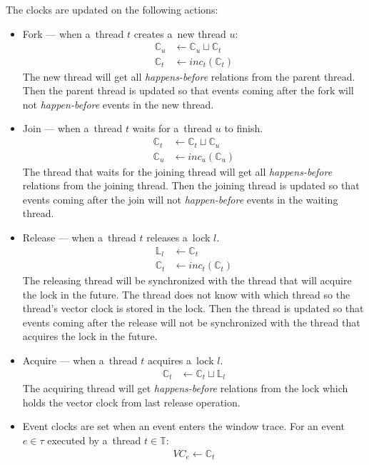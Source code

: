 The clocks are updated on the following actions:
\begin{itemize}
    \item Fork --- when a~thread $t$ creates a~new thread $u$:
        \begin{align*}
            \mathbb{C}_u &\leftarrow \mathbb{C}_u \sqcup \mathbb{C}_t \\
            \mathbb{C}_t &\leftarrow inc_t(\mathbb{C}_t)
        \end{align*}
        The new thread will get all \emph{happens-before} relations from the
        parent thread. Then the parent thread is updated so that events coming
        after the fork will not \emph{happen-before} events in the new thread.
    \item Join --- when a~thread $t$ waits for a~thread $u$ to finish.
        \begin{align*}
            \mathbb{C}_t &\leftarrow \mathbb{C}_t \sqcup \mathbb{C}_u \\
            \mathbb{C}_u &\leftarrow inc_u(\mathbb{C}_u)
        \end{align*}
        The thread that waits for the joining thread will get all
        \emph{happens-before} relations from the joining thread. Then the
        joining thread is updated so that events coming after the join will not
        \emph{happen-before} events in the waiting thread.
    \item Release --- when a~thread $t$ releases a~lock $l$.
        \begin{align*}
            \mathbb{L}_l &\leftarrow \mathbb{C}_t \\
            \mathbb{C}_t &\leftarrow inc_t(\mathbb{C}_t)
        \end{align*}
        The releasing thread will be synchronized with the thread that will
        acquire the lock in the future. The thread does not know with which
        thread so the thread's vector clock is stored in the lock. Then the
        thread is updated so that events coming after the release will not be
        synchronized with the thread that acquires the lock in the future.
    \item Acquire --- when a~thread $t$ acquires a~lock $l$.
        \begin{align*}
            \mathbb{C}_t &\leftarrow \mathbb{C}_t \sqcup \mathbb{L}_l
        \end{align*}
        The acquiring thread will get \emph{happens-before} relations from the
        lock which holds the vector clock from last release operation.
    \item Event clocks are set when an event enters the window trace. For an
        event $e \in \tau$ executed by a~thread $t \in \mathbb{T}$:
        \begin{align*}
            VC_e \leftarrow \mathbb{C}_t
        \end{align*}
\end{itemize}


